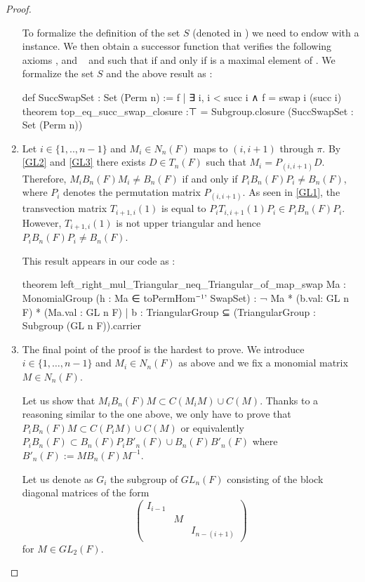 \begin{proof}
\begin{enumerate}
To formalize the definition of the set $S$ (denoted  in \Lean) we need to endow  with a \lean{[SuccOrder n]} instance. We then obtain a successor function  that verifies the following axioms ,  and  ~ and such that  if and only if  is a maximal element of .
    We formalize the set $S$ and the above result as :
\begin{leancode}
def SuccSwapSet : Set (Perm n) := {f | ∃ i, i < succ i ∧ f = swap i (succ i) }
theorem top_eq_succ_swap_closure :⊤ = Subgroup.closure (SuccSwapSet : Set (Perm n))
\end{leancode}

\item Let $i \in  \{ 1,..,n-1\}$ and $M_i \in N_n(F)$ maps to $\left( i,i+1 \right)$ through $\pi$. By \ref{GL2} and \ref{GL3} there exists $D \in T_n(F)$ such that $M_i = P_{(i,i+1)} D$. Therefore, $M_i B_n(F) M_i \neq B_n(F)$ if and only if $P_{i} B_n(F) P_{i}\neq B_n(F)$, where $P_i$ denotes the permutation matrix $P_{(i,i+1)}$. As seen in \ref{GL1}, the transvection matrix $T_{i+1,i}(1)$ is equal to $P_{i} T_{i,i+1}(1) P_{i} \in P_{i}B_n(F) P_{i}$. However, $T_{i+1, i}(1)$ is not upper triangular and hence $P_{i} B_n(F) P_{i} \neq B_n(F)$.

    This result appears in our code as :
\begin{leancode}
theorem left_right_mul_Triangular_neq_Triangular_of_map_swap {Ma : MonomialGroup}
 (h : Ma ∈ toPermHom⁻¹' SwapSet) :
   ¬ {Ma * (b.val: GL n F) * (Ma.val : GL n F) | b :  TriangularGroup} ⊆
    (TriangularGroup : Subgroup (GL n F)).carrier
\end{leancode}




\item The final point of the proof is the hardest to prove. We introduce $i \in \{1,\ldots,n-1\}$ and $M_i \in N_n(F)$ as above and we fix a monomial matrix $M \in N_n(F)$. 

    Let us show that $M_i B_n(F) M \subset C(M_iM) \cup C(M) $. Thanks to a reasoning similar to the one above, we only have to prove that  $P_{i} B_n(F) M \subset C\left( P_i M \right)\cup C(M)$ or equivalently $P_i B_n(F) \subset B_n(F) P_i B'_n(F) \cup B_n(F) B'_n(F) $ where $B'_n(F) := M B_n(F)M^{-1}$.

    Let us denote as $G_i$ the subgroup of $GL_n(F)$ consisting of the block diagonal matrices of the form 
    $$\begin{pmatrix} 
        I_{i-1} \\
        & M\\
        & & I_{n-(i+1)}
    \end{pmatrix}$$
    for $M \in GL_2\left( F \right)$.


\end{enumerate}
\end{proof}
